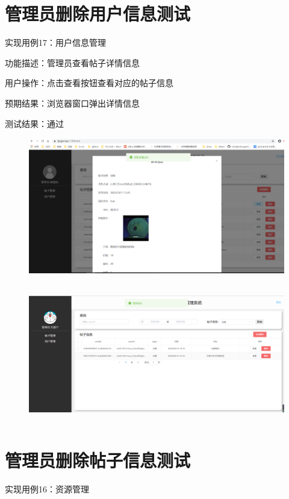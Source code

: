 \section{管理员删除用户信息测试}
实现用例17：用户信息管理

功能描述：管理员查看帖子详情信息
   
用户操作：点击查看按钮查看对应的帖子信息

预期结果：浏览器窗口弹出详情信息

测试结果：通过
\begin{figure}[htbp]
    \centering
    \begin{minipage}[t]{0.9\textwidth}
    \centering
    \includegraphics[width=12cm,height=6cm]{test/image/adm11.png} 
    \end{minipage}
    \end{figure}   
    \begin{figure}[htbp]
        \centering
        \begin{minipage}[t]{0.9\textwidth}
        \centering
        \includegraphics[width=12cm,height=6cm]{test/image/adm12.png} 
        \end{minipage}
        \end{figure}   
        \newpage    
\section{管理员删除帖子信息测试}
实现用例16：资源管理

